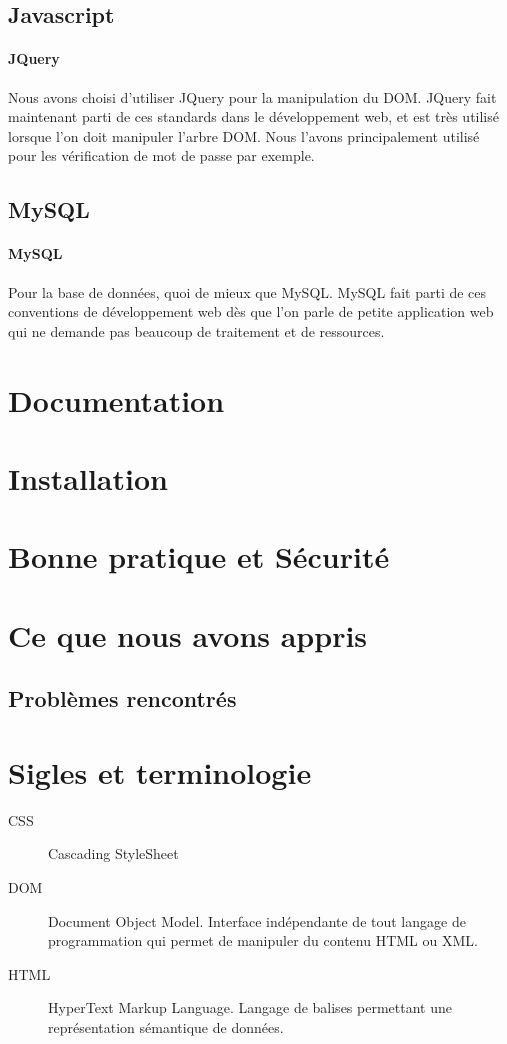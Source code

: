 \documentclass[12pt]{article}
\begin{document}
    \subsection{Javascript}
        \paragraph{JQuery} Nous avons choisi d'utiliser JQuery pour la manipulation du DOM. JQuery fait maintenant parti de ces standards dans le développement web, et est très utilisé lorsque l'on doit manipuler l'arbre DOM. Nous l'avons principalement utilisé pour les vérification de mot de passe par exemple.
    
    \subsection{MySQL}
        \paragraph{MySQL} Pour la base de données, quoi de mieux que MySQL. MySQL fait parti de ces conventions de développement web dès que l'on parle de petite application web qui ne demande pas beaucoup de traitement et de ressources.
    

\section{Documentation}

\section{Installation}

\section{Bonne pratique et Sécurité}

\section{Ce que nous avons appris}
    \subsection{Problèmes rencontrés}
    
    
\section{Sigles et terminologie}
    \begin{description}
        \item[CSS] Cascading StyleSheet
        \item[DOM] Document Object Model. Interface indépendante de tout langage de programmation qui permet de manipuler du contenu HTML ou XML.
        \item[HTML] HyperText Markup Language. Langage de balises permettant une représentation sémantique de données.
    \end{description}
\end{document}

